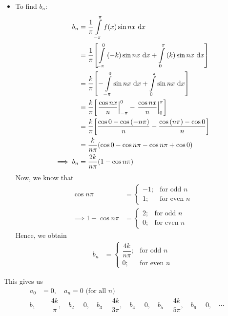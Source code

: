 \begin{itemize}
            \item To find $b_n$:
            \begin{align*}
                b_n&=\dfrac{1}{\pi}\int\limits_{-\pi}^{\pi}{f(x)\sin{nx}\,\dd{x}} \\
                    &=\dfrac{1}{\pi}\qty[\int\limits_{-\pi}^{0}{(-k)\sin{nx}\,\dd{x}}+\int\limits_{0}^{\pi}{(k)\sin{nx}\,\dd{x}}] \\
                    &=\dfrac{k}{\pi}\qty[-\int\limits_{-\pi}^{0}{\sin{nx}\,\dd{x}}+\int\limits_{0}^{\pi}{\sin{nx}\,\dd{x}}] \\
                    &=\dfrac{k}{\pi}\qty[\left.\dfrac{\cos{nx}}{n}\right|_{-\pi}^{0}-\left.\dfrac{\cos{nx}}{n}\right|_{0}^{\pi}] \\
                    &=\dfrac{k}{\pi}\qty[\dfrac{{\cos{0}}-{\cos{(-n\pi)}}}{n}-\dfrac{{\cos{(n\pi)}}-{\cos{0}}}{n}] \\
                    &=\dfrac{k}{n\pi}\qty(\cos{0}-\cos{n\pi}-\cos{n\pi}+\cos{0}) \\
                \implies b_n&=\dfrac{2k}{n\pi}\qty(1-\cos{n\pi})
            \end{align*}
            Now, we know that
            \begin{align*}
                \cos{n\pi}&=\begin{cases}
                    {-1;} & {\text{for odd }n} \\
                    {1;} & {\text{for even }n}
                \end{cases} \\
                \implies 1-\cos{n\pi}&=\begin{cases}
                    {2;} & {\text{for odd }n} \\
                    {0;} & {\text{for even }n}
                \end{cases}
            \end{align*}
            Hence, we obtain
            \begin{align*}
                b_n&=\begin{cases}
                    {\dfrac{4k}{n\pi};} & {\text{for odd }n} \\
                    {0;} & {\text{for even }n}
                \end{cases}
            \end{align*}
        \end{itemize}
        This gives us
            \begin{align*}
                a_0&=0,\quad a_n=0\text{ (for all $n$)} \\
                b_1&=\dfrac{4k}{\pi},\quad b_2=0,\quad b_3=\dfrac{4k}{3\pi},\quad b_4=0,\quad b_5=\dfrac{4k}{5\pi},\quad b_6=0,\quad\cdots
            \end{align*}

